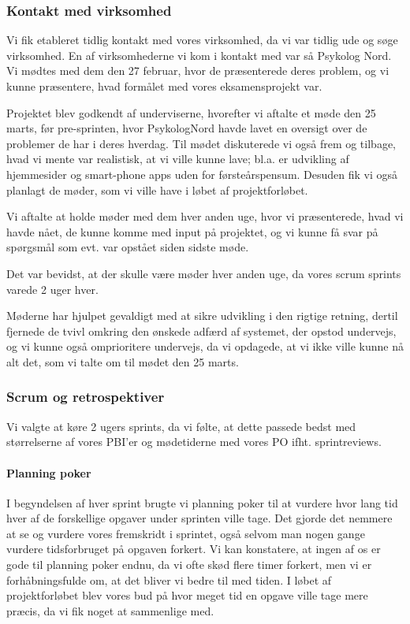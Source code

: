 \subsubsection{Kontakt med virksomhed}

Vi fik etableret tidlig kontakt med vores virksomhed, da vi var tidlig ude og søge virksomhed.
En af virksomhederne vi kom i kontakt med var så Psykolog Nord.
Vi mødtes med dem den 27 februar, hvor de præsenterede deres problem, og vi kunne præsentere, hvad formålet med vores eksamensprojekt var.

Projektet blev godkendt af underviserne, hvorefter vi aftalte et møde den 25 marts, før pre-sprinten, hvor PsykologNord havde lavet en oversigt over de problemer de har i deres hverdag.
Til mødet diskuterede vi også frem og tilbage, hvad vi mente var realistisk, at vi ville kunne lave; bl.a. er udvikling af hjemmesider og smart-phone apps uden for førsteårspensum.
Desuden fik vi også planlagt de møder, som vi ville have i løbet af projektforløbet.

Vi aftalte at holde møder med dem hver anden uge, hvor vi præsenterede, hvad vi havde nået, de kunne komme med input på projektet, og vi kunne få svar på spørgsmål som evt. var opstået siden sidste møde.

Det var bevidst, at der skulle være møder hver anden uge, da vores scrum sprints varede 2 uger hver.

Møderne har hjulpet gevaldigt med at sikre udvikling i den rigtige retning, dertil fjernede de tvivl omkring den ønskede adfærd af systemet, der opstod undervejs, og vi kunne også omprioritere undervejs, da vi opdagede, at vi ikke ville kunne nå alt det, som vi talte om til mødet den 25 marts.



\subsubsection{Scrum og retrospektiver}

Vi valgte at køre 2 ugers sprints, da vi følte, at dette passede bedst med størrelserne af vores PBI'er og mødetiderne med vores PO ifht. sprintreviews.

\paragraph*{Planning poker}
I begyndelsen af hver sprint brugte vi planning poker til at vurdere hvor lang tid hver af de forskellige opgaver under sprinten ville tage.
Det gjorde det nemmere at se og vurdere vores fremskridt i sprintet, også selvom man nogen gange vurdere tidsforbruget på opgaven forkert.
Vi kan konstatere, at ingen af os er gode til planning poker endnu, da vi ofte skød flere timer forkert, men vi er forhåbningsfulde om, at det bliver vi bedre til med tiden.
I løbet af projektforløbet blev vores bud på hvor meget tid en opgave ville tage mere præcis, da vi fik noget at sammenlige med.

